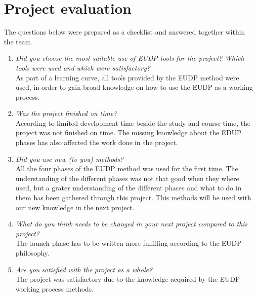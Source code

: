 \section{Project evaluation}
The questions below were prepared as a checklist and answered together within the team.
\begin{enumerate}
\item \textit{Did you choose the most suitable use of EUDP tools for the project? Which tools were used and which were satisfactory?}\\
		As part of a learning curve, all tools provided by the EUDP method were used, in order to gain broad knowledge on how to use the EUDP as a working process.
\item \textit{Was the project finished on time?}\\
		According to limited development time beside the study and course time, the project was not finished on time. The missing knowledge about the EDUP phases has also affected the work done in the project.
\item \textit{Did you use new (to you) methods?}\\
		All the four phases of the EUDP method was used for the first time. The understanding of the different phases was not that good when they where used, but a grater understanding of the different phases and what to do in them has been gathered through this project. This methods will be used with our new knowledge in the next project.
\item \textit{What do you think needs to be changed in your next project compared to this project?}\\
		The launch phase has to be written more fulfilling according to the EUDP philosophy.
\item \textit{Are you satisfied with the project as a whole?} \\
		The project was satisfactory due to the knowledge acquired by the EUDP working process methods.
\end{enumerate}